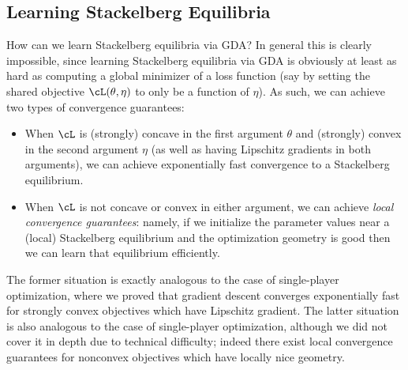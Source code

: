 \documentclass[../../book-main.tex]{subfiles}
\begin{document}
\subsection{Learning Stackelberg Equilibria}

How can we learn Stackelberg equilibria via GDA? In general this is
clearly impossible, since learning Stackelberg equilibria via GDA is
obviously at least as hard as computing a global minimizer of a loss
function (say by setting the shared objective \(\cL(\theta, \eta)\)
to only be a function of \(\eta\)). As such, we can achieve two types
of convergence guarantees:
\begin{itemize}
    \item When \(\cL\) is (strongly) concave in the first argument
        \(\theta\) and (strongly) convex in the second argument
        \(\eta\) (as well as having Lipschitz gradients in both
        arguments), we can achieve exponentially fast convergence to
        a Stackelberg equilibrium.
    \item When \(\cL\) is not concave or convex in either argument,
        we can achieve \textit{local convergence guarantees}: namely,
        if we initialize the parameter values near a (local)
        Stackelberg equilibrium and the optimization geometry is good
        then we can learn that equilibrium efficiently.
\end{itemize}

The former situation is exactly analogous to the case of
single-player optimization, where we proved that gradient descent
converges exponentially fast for strongly convex objectives which
have Lipschitz gradient. The latter situation is also analogous to
the case of single-player optimization, although we did not cover it
in depth due to technical difficulty; indeed there exist local
convergence guarantees for nonconvex objectives which have locally
nice geometry.
\end{document}
